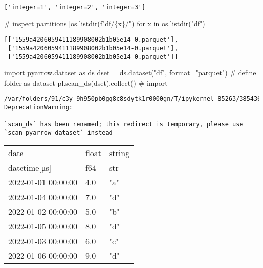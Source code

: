 \documentclass[
  letterpaper,
  DIV=11,
  numbers=noendperiod]{scrartcl}
\newenvironment{Shaded}{\begin{snugshade}}{\end{snugshade}}
\newcommand{\BuiltInTok}[1]{\textcolor[rgb]{0.00,0.23,0.31}{#1}}
\newcommand{\CommentTok}[1]{\textcolor[rgb]{0.37,0.37,0.37}{#1}}
\newcommand{\ControlFlowTok}[1]{\textcolor[rgb]{0.00,0.23,0.31}{#1}}
\newcommand{\ImportTok}[1]{\textcolor[rgb]{0.00,0.46,0.62}{#1}}
\newcommand{\KeywordTok}[1]{\textcolor[rgb]{0.00,0.23,0.31}{#1}}
\newcommand{\NormalTok}[1]{\textcolor[rgb]{0.00,0.23,0.31}{#1}}
\newcommand{\OperatorTok}[1]{\textcolor[rgb]{0.37,0.37,0.37}{#1}}
\newcommand{\SpecialCharTok}[1]{\textcolor[rgb]{0.37,0.37,0.37}{#1}}
\newcommand{\SpecialStringTok}[1]{\textcolor[rgb]{0.13,0.47,0.30}{#1}}
\newcommand{\StringTok}[1]{\textcolor[rgb]{0.13,0.47,0.30}{#1}}
\begin{document}
\begin{verbatim}
['integer=1', 'integer=2', 'integer=3']
\end{verbatim}

\begin{Shaded}
\begin{Highlighting}[]
\CommentTok{\# inspect partitions}
\NormalTok{[os.listdir(}\SpecialStringTok{f"df/}\SpecialCharTok{\{}\NormalTok{x}\SpecialCharTok{\}}\SpecialStringTok{/"}\NormalTok{) }\ControlFlowTok{for}\NormalTok{ x }\KeywordTok{in}\NormalTok{ os.listdir(}\StringTok{"df"}\NormalTok{)]}
\end{Highlighting}
\end{Shaded}

\begin{verbatim}
[['1559a4206059411189908002b1b05e14-0.parquet'],
 ['1559a4206059411189908002b1b05e14-0.parquet'],
 ['1559a4206059411189908002b1b05e14-0.parquet']]
\end{verbatim}

\begin{Shaded}
\begin{Highlighting}[]
\ImportTok{import}\NormalTok{ pyarrow.dataset }\ImportTok{as}\NormalTok{ ds}
\NormalTok{dset }\OperatorTok{=}\NormalTok{ ds.dataset(}\StringTok{"df"}\NormalTok{, }\BuiltInTok{format}\OperatorTok{=}\StringTok{"parquet"}\NormalTok{)  }\CommentTok{\# define folder as dataset}
\NormalTok{pl.scan\_ds(dset).collect() }\CommentTok{\# import}
\end{Highlighting}
\end{Shaded}

\begin{verbatim}
/var/folders/91/c3y_9h950pb0gq8c8sdytk1r0000gn/T/ipykernel_85263/385436092.py:3: DeprecationWarning:

`scan_ds` has been renamed; this redirect is temporary, please use `scan_pyarrow_dataset` instead
\end{verbatim}

\begin{longtable}[]{@{}lll@{}}
\toprule()
date & float & string \\
datetime{[}μs{]} & f64 & str \\
\midrule()
\endhead
2022-01-01 00:00:00 & 4.0 & "a" \\
2022-01-04 00:00:00 & 7.0 & "d" \\
2022-01-02 00:00:00 & 5.0 & "b" \\
2022-01-05 00:00:00 & 8.0 & "d" \\
2022-01-03 00:00:00 & 6.0 & "c" \\
2022-01-06 00:00:00 & 9.0 & "d" \\
\bottomrule()
\end{longtable}
\end{document}
